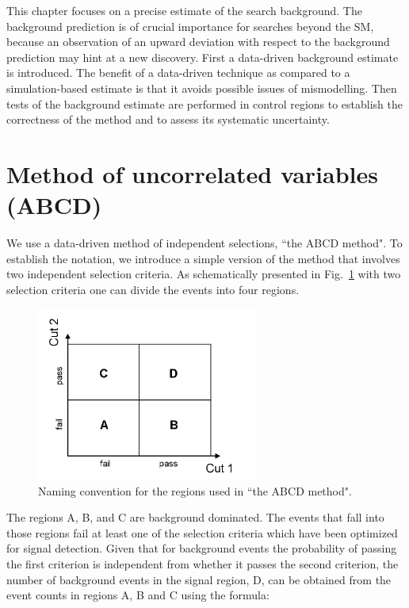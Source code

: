 This chapter focuses on a precise estimate of the search background. The
background prediction is of crucial importance for searches beyond the SM, because an observation
of an upward deviation with respect to the background prediction may hint at a new discovery.
First a data-driven background estimate is introduced. The benefit of a data-driven technique
as compared to a simulation-based estimate is that it avoids possible issues of 
mismodelling. Then tests of the background estimate are performed 
in control regions to establish the correctness of the method and to assess
its systematic uncertainty.


\section{Method of uncorrelated variables (ABCD)}




\label{sec:abcd}
We use a data-driven method of independent selections, ``the ABCD method".
To establish the notation, we introduce a simple version of the method that involves two 
independent selection criteria. As schematically presented in Fig.~\ref{fig:abcd} 
with two selection criteria one can divide the events into four
regions.
\begin{figure}[htbp]
\centering
\includegraphics[width=0.65\textwidth]{plots/abcd.png}
\caption{Naming convention for the regions used in ``the ABCD method".\label{fig:abcd}}
\end{figure}
The regions A, B, and C are background dominated. The events that fall into those regions fail at least 
one of the selection criteria which have been optimized for signal detection. 
Given that for background events the probability of passing the first criterion is independent 
from whether it passes the second criterion, the number
of background events in the signal region, D, can be obtained from the event counts in regions A, B and C using the formula:

